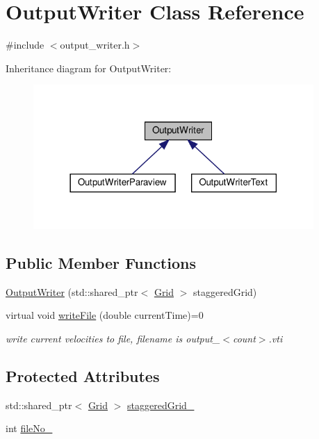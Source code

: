 \hypertarget{classOutputWriter}{}\section{Output\+Writer Class Reference}
\label{classOutputWriter}


{\ttfamily \#include $<$output\+\_\+writer.\+h$>$}



Inheritance diagram for Output\+Writer\+:\nopagebreak
\begin{figure}[H]
\begin{center}
\leavevmode
\includegraphics[width=302pt]{classOutputWriter__inherit__graph}
\end{center}
\end{figure}
\subsection*{Public Member Functions}
\begin{DoxyCompactItemize}
\item 
\mbox{\hyperlink{classOutputWriter_aa42fc9f21e7a107080c94c413b6b713b}{Output\+Writer}} (std\+::shared\+\_\+ptr$<$ \mbox{\hyperlink{classGrid}{Grid}} $>$ staggered\+Grid)
\item 
virtual void \mbox{\hyperlink{classOutputWriter_ac625c204affdc05919388a3549c2e945}{write\+File}} (double current\+Time)=0
\begin{DoxyCompactList}\small\item\em write current velocities to file, filename is output\+\_\+$<$count$>$.\+vti \end{DoxyCompactList}\end{DoxyCompactItemize}
\subsection*{Protected Attributes}
\begin{DoxyCompactItemize}
\item 
std\+::shared\+\_\+ptr$<$ \mbox{\hyperlink{classGrid}{Grid}} $>$ \mbox{\hyperlink{classOutputWriter_a6cfc5734d2c819d75fbe39a98b1e0d31}{staggered\+Grid\+\_\+}}
\item 
int \mbox{\hyperlink{classOutputWriter_a69d167e2526407602dce26ca7a2b9248}{file\+No\+\_\+}}
\end{DoxyCompactItemize}


